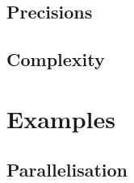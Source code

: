 \documentclass[a4paper,11pt]{article}
\numberwithin{equation}{section}
\theoremstyle{definition}
\begin{document}
\subsection{Precisions}

\subsection{Complexity}

\section{Examples}
\label{sec:Examples}

\subsection{Parallelisation}
\end{document}
